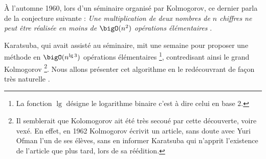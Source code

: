 À l'automne 1960, lors d'un séminaire organisé par Kolmogorov, ce dernier parla de la conjecture suivante :
\emph{\og Une multiplication de deux nombres de $n$ chiffres ne peut être réalisée en moins de $\bigO(n^2)$ opérations élémentaires \fg}.

\medskip

Karatsuba, qui avait assisté au séminaire, mit une semaine pour proposer une méthode en $\bigO(n^{\lg 3})$ opérations élémentaires
\footnote{
    La fonction $\lg$ désigne le logarithme binaire c'est à dire celui en base $2$.
},
contredisant ainsi le grand Kolmogorov
\footnote{
    Il semblerait que Kolomogorov ait été très secoué par cette découverte, voire vexé.
    En effet, en 1962 Kolmogorov écrivit un article, sans doute avec Yuri Ofman l'un de ses élèves, sans en informer Karatsuba qui n'apprit l'existence de l'article que plus tard, lors de sa réédition.
}.
Nous allons présenter cet algorithme en le redécouvrant de façon très \og naturelle \fg.
